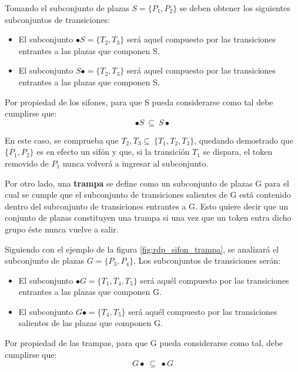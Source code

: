 Tomando el subconjunto de plazas $S = \{P_1 , P_2 \}$ se deben obtener los siguientes subconjuntos de transiciones:
\begin{itemize}
    \item El subconjunto $\bullet S = \{T_2, T_3 \}$ será aquel compuesto por las transiciones entrantes a las plazas que componen S.
    \item El subconjunto $S \bullet = \{T_2, T_3\} $ será aquel compuesto por las transiciones entrantes a las plazas que componen S.
\end{itemize}

\noindent Por propiedad de los sifones, para que S pueda considerarse como tal debe cumplirse que:
\begin{equation}
    \bullet S \ \subseteq \ S \bullet 
\end{equation}

En este caso, se comprueba que ${T_2 , T_3} \subseteq \ \{T_1 , T_2 , T_3 \}$, quedando demostrado que $\{P_1,P_2\}$ es en efecto un sifón y que, si la transición $T_1$ se dispara, el token removido de $P_1$ nunca volverá a ingresar al subconjunto. \\ \par

Por otro lado, una \textbf{trampa} se define como un subconjunto de plazas G para el cual se cumple que el subconjunto de transiciones salientes de G está contenido dentro del subconjunto de transiciones entrantes a G. Esto quiere decir que un conjunto de plazas constituyen una trampa si una vez que un token entra dicho grupo éste nunca vuelve
a salir.

Siguiendo con el ejemplo de la figura \ref{fig:rdp_sifon_trampa}, se analizará el subconjunto de plazas $G = \{P_3 , P_4\}$.  Los subconjuntos de transiciones serán:
\begin{itemize}
    \item El subconjunto $\bullet G = \{T_1 , T_4 , T_5 \}$ será aquél compuesto por las transiciones entrantes a las plazas que componen G.
    \item El subconjunto $G \bullet = \{T_4, T_5 \}$ será aquél compuesto por las transiciones salientes de las plazas que componen G.
\end{itemize}

\noindent Por propiedad de las trampas, para que G pueda considerarse como tal, debe cumplirse que:
\begin{equation}
    G \bullet \ \subseteq \ \bullet G
\end{equation}

